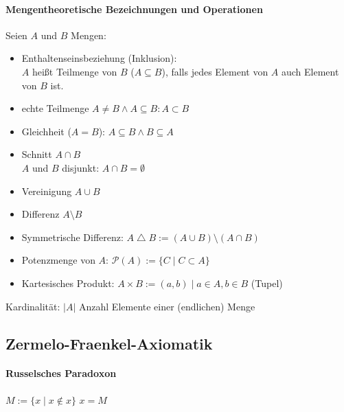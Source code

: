 \paragraph{Mengentheoretische Bezeichnungen und Operationen}
Seien $A$ und $B$ Mengen:
\begin{itemize}
	\item Enthaltenseinsbeziehung (Inklusion):\\ $A$ heißt Teilmenge von $B$ ($A
		      \subseteq B$), falls jedes Element von $A$ auch Element von $B$ ist.
	\item echte Teilmenge $A \neq B \land A \subseteq B:A \subset B$
	\item Gleichheit ($A = B$): $A\subseteq B \land B \subseteq A$
	\item Schnitt $A \cap B$\\ $A$ und $B$ disjunkt: $A \cap B = \emptyset$

	\item Vereinigung $A \cup B$
	\item Differenz       $A \setminus B$
	\item Symmetrische Differenz: $A \bigtriangleup B := (A \cup B)\setminus (A\cap B)$
	\item Potenzmenge von $A$: $\mathcal{P}(A) := \{C\mid C\subset A\}$
	\item Kartesisches Produkt: $A \times B := {(a,b)\mid a\in A, b\in B}$ (Tupel)
\end{itemize}

Kardinalität: $|A|$ Anzahl Elemente einer (endlichen) Menge

\subsection{Zermelo-Fraenkel-Axiomatik}
\paragraph{Russelsches Paradoxon}
$M:= \{x\mid x\not\in x\}$ $x=M$\lightning{}
